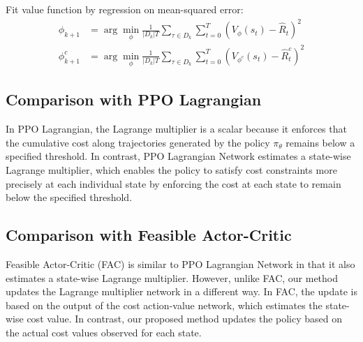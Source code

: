 \begin{algorithm}
{    
    Fit value function by regression on mean-squared error:
    \begin{equation*}
      \begin{aligned}
        \phi_{k + 1} &= \arg\min_\phi \frac{1}{|D_k|T} \sum_{\tau \in D_k} \sum^T_{t = 0} \left( V_\phi(s_t) - \hat{R}_t \right)^2 \\
        \phi^c_{k + 1} &= \arg\min_\phi \frac{1}{|D_k|T} \sum_{\tau \in D_k} \sum^T_{t = 0} \left( V_{\phi^c}(s_t) - \hat{R}^c_t \right)^2
      \end{aligned}
    \end{equation*}
  }
\end{algorithm}

\subsection{Comparison with PPO Lagrangian}

In PPO Lagrangian, the Lagrange multiplier is a scalar because it enforces that the cumulative cost along trajectories generated by the policy $\pi_\theta$ remains below a specified threshold.
In contrast, PPO Lagrangian Network estimates a state-wise Lagrange multiplier, which enables the policy to satisfy cost constraints more precisely at each individual state by enforcing the cost at each state to remain below the specified threshold.

\subsection{Comparison with Feasible Actor-Critic}

Feasible Actor-Critic (FAC) is similar to PPO Lagrangian Network in that it also estimates a state-wise Lagrange multiplier.
However, unlike FAC, our method updates the Lagrange multiplier network in a different way.
In FAC, the update is based on the output of the cost action-value network, which estimates the state-wise cost value.
In contrast, our proposed method updates the policy based on the actual cost values observed for each state.